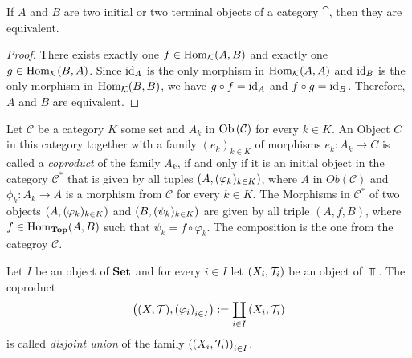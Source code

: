 \begin{theorem} \cite[p. 83]{Alg1&2}
	If $A$ and $B$ are two initial or two terminal objects of a category $\cat$, then they are equivalent. 
\end{theorem}
\begin{proof}
	There exists exactly one $f \in \operatorname{Hom}_\mathcal K(A, B)$ and exactly one $g \in \operatorname{Hom}_\mathcal K(B,A)$. Since $\operatorname{id}_A$ is the only morphism in $\operatorname{Hom}_\mathcal K(A, A)$ and $\operatorname{id}_B$ is the only morphism in $\operatorname{Hom}_\mathcal K(B, B)$, we have $g \circ f = \operatorname{id}_A$ and $f \circ g = \operatorname{id}_B$. Therefore, $A$ and $B$ are equivalent. 
\end{proof}

\begin{definition}
	Let $\mathcal{C}$ be a category $K$ some set and $A_k$ in $\operatorname{Ob}{\left ( \mathcal{C} \right )}$ for every $k \in K$. An Object $C$ in this category together with a family $(e_k)_{k \in K}$ of morphisms $e_k: A_k \to C$ is called a \textit{coproduct} of the family $A_k$, if and only if it is an initial object in the category $\mathcal{C}^\ast$ that is given by all tuples ${\left ( A, (\varphi_k)_{k \in K} \right )}$, where $A$ in $Ob(\mathcal{C})$ and $\phi_k: A_k \to A$ is a morphism from $\mathcal{C}$ for every $k \in K$. The Morphisms in $\mathcal{C}^\ast$ of two objects ${\left ( A, (\varphi_k)_{k \in K} \right )}$ and ${\left ( B, (\psi_k)_{k \in K} \right )}$ are given by all triple $(A, f, B)$, where $f \in \operatorname{Hom}_{\mathbf{Top}}(A, B)$ such that $\psi_k = f \circ \varphi_k$. The composition is the one from the categroy $\mathcal{C}$. 
\end{definition}

\begin{definition}
	Let $I$ be an object of $\mathbf{Set}$ and for every $i \in I$ let ${\left ( X_i, \mathcal{T}_i \right )}$ be an object of $\Top$. The coproduct 
	\begin{align*}
	\pbraces{\tspace, \pbraces{\varphi_i}_{i \in I}} := \coprod_{i \in I} \pbraces{X_i, \Tc_i}
	\end{align*}
	is called \textit{disjoint union} of the family ${\left ( {\left ( X_i, \mathcal{T}_i \right )} \right )}_{i \in I}$.
\end{definition}

